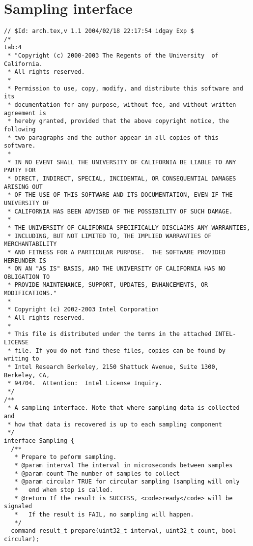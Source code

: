 \documentclass{article}
\begin{document}
\appendix
\small

\section{Sampling interface}
\label{intf:sampling}

\begin{verbatim}
// $Id: arch.tex,v 1.1 2004/02/18 22:17:54 idgay Exp $
/*                                                                      tab:4
 * "Copyright (c) 2000-2003 The Regents of the University  of California.  
 * All rights reserved.
 *
 * Permission to use, copy, modify, and distribute this software and its
 * documentation for any purpose, without fee, and without written agreement is
 * hereby granted, provided that the above copyright notice, the following
 * two paragraphs and the author appear in all copies of this software.
 * 
 * IN NO EVENT SHALL THE UNIVERSITY OF CALIFORNIA BE LIABLE TO ANY PARTY FOR
 * DIRECT, INDIRECT, SPECIAL, INCIDENTAL, OR CONSEQUENTIAL DAMAGES ARISING OUT
 * OF THE USE OF THIS SOFTWARE AND ITS DOCUMENTATION, EVEN IF THE UNIVERSITY OF
 * CALIFORNIA HAS BEEN ADVISED OF THE POSSIBILITY OF SUCH DAMAGE.
 * 
 * THE UNIVERSITY OF CALIFORNIA SPECIFICALLY DISCLAIMS ANY WARRANTIES,
 * INCLUDING, BUT NOT LIMITED TO, THE IMPLIED WARRANTIES OF MERCHANTABILITY
 * AND FITNESS FOR A PARTICULAR PURPOSE.  THE SOFTWARE PROVIDED HEREUNDER IS
 * ON AN "AS IS" BASIS, AND THE UNIVERSITY OF CALIFORNIA HAS NO OBLIGATION TO
 * PROVIDE MAINTENANCE, SUPPORT, UPDATES, ENHANCEMENTS, OR MODIFICATIONS."
 *
 * Copyright (c) 2002-2003 Intel Corporation
 * All rights reserved.
 *
 * This file is distributed under the terms in the attached INTEL-LICENSE     
 * file. If you do not find these files, copies can be found by writing to
 * Intel Research Berkeley, 2150 Shattuck Avenue, Suite 1300, Berkeley, CA, 
 * 94704.  Attention:  Intel License Inquiry.
 */
/** 
 * A sampling interface. Note that where sampling data is collected and
 * how that data is recovered is up to each sampling component
 */
interface Sampling {
  /**
   * Prepare to peform sampling. 
   * @param interval The interval in microseconds between samples
   * @param count The number of samples to collect
   * @param circular TRUE for circular sampling (sampling will only
   *   end when stop is called.
   * @return If the result is SUCCESS, <code>ready</code> will be signaled
   *   If the result is FAIL, no sampling will happen.
   */
  command result_t prepare(uint32_t interval, uint32_t count, bool circular);


\end{verbatim}
\end{document}
